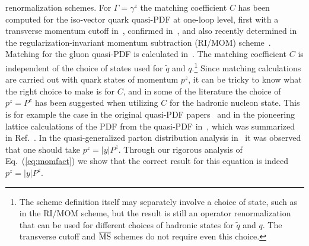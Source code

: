 \documentclass[prd,aps,twocolumn,preprintnumbers,showpacs,nofootinbib,superscriptaddress,notitlepage]{revtex4-1}
\DeclareRobustCommand{\eq}[1]{Eq.~(\ref{eq:#1})}
\begin{document}
renormalization schemes. For $\Gamma=\gamma^z$ the matching coefficient $C$ has been computed for the iso-vector quark quasi-PDF at one-loop level, first with a transverse momentum cutoff in~\cite{Xiong:2013bka}, confirmed in~\cite{Ma:2014jla,Alexandrou:2015rja}, and also recently determined in the regularization-invariant momentum subtraction (RI/MOM) scheme~\cite{Stewart:2017tvs}. Matching for the gluon quasi-PDF is calculated in~\cite{Wang:2017qyg,Wang:2017eel}. The matching coefficient $C$ is independent of the choice of states used for $\tilde q$ and $q$.\footnote{The scheme definition itself may separately involve a choice of state, such as in the RI/MOM scheme, but the result is still an operator renormalization that can be used for different choices of hadronic states for $\tilde q$ and $q$. The transverse cutoff and $\overline{\rm MS}$ schemes do not require even this choice.} Since matching calculations are carried out with quark states of momentum $p^z$, it can be tricky to know what the right choice to make is for $C$, and in some of the literature the choice of $p^z=P^z$ has been suggested when utilizing $C$ for the hadronic nucleon state. This is for example the case in the original quasi-PDF papers~\cite{Ji:2013dva,Ji:2014gla,Xiong:2013bka} and in the pioneering lattice calculations of the PDF from the quasi-PDF in~\cite{Lin:2014zya,Alexandrou:2015rja,Chen:2016utp,Alexandrou:2016jqi,Zhang:2017bzy,Alexandrou:2017huk,Chen:2017mzz,Lin:2017ani,Chen:2017gck}, which was summarized in Ref.~\cite{Lin:2017snn}. In the quasi-generalized parton distribution analysis in~\cite{Ji:2015qla} it was observed that one should take $p^z=|y|P^z$.  Through our rigorous analysis of \eq{momfact} we show that the correct result for this equation is indeed $p^z=|y|P^z$.
\end{document}
